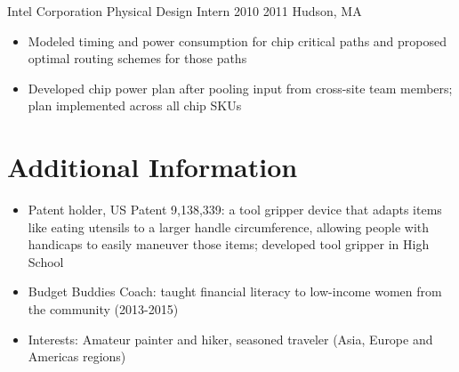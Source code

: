 \documentclass[a4paper,11pt]{business}
\begin{document}
{\begin{itemize}
 \end{itemize}
}

\entry
 {Intel Corporation}
 {Physical Design Intern}
 {2010}
 {2011}
 {Hudson, MA}{
 \begin{itemize}
  \item Modeled timing and power consumption for chip critical paths and proposed optimal routing schemes for those paths
  \item Developed chip power plan after pooling input from cross-site team members; plan implemented across all chip SKUs
 \end{itemize}
} 


\section{Additional Information}

\begin{itemize}
 \item Patent holder, US Patent 9,138,339: a tool gripper device that adapts items like eating utensils to a larger handle circumference, allowing people with handicaps to easily maneuver those items; developed tool gripper in High School
 \item Budget Buddies Coach: taught financial literacy to low-income women from the community (2013-2015)
 \item Interests: Amateur painter and hiker, seasoned traveler (Asia, Europe and Americas regions)
\end{itemize}
\end{document}
